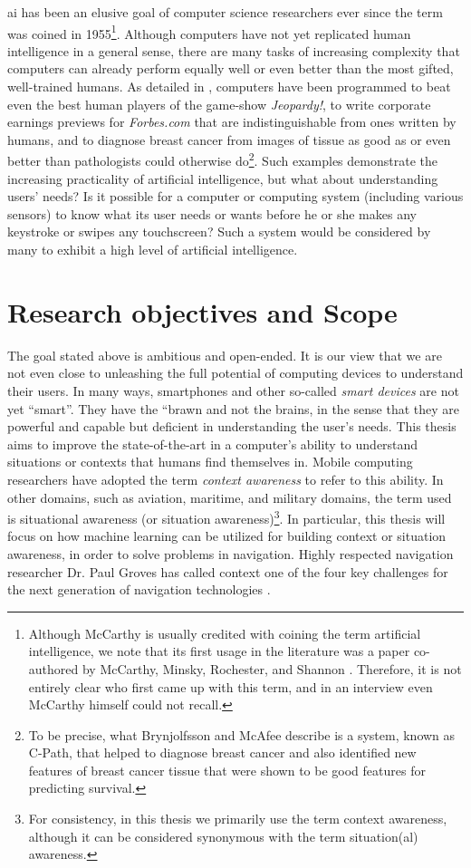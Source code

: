 \gls{ai} has been an elusive goal of computer science researchers ever since the term was coined in 1955\footnote{Although McCarthy is usually credited with coining the term artificial intelligence, we note that its first usage in the literature was a paper co-authored by McCarthy, Minsky, Rochester, and Shannon \cite{McCarthy1955}. Therefore, it is not entirely clear who first came up with this term, and in an interview even McCarthy himself could not recall.%
}. Although computers have not yet replicated human intelligence in a general sense, there are many tasks of increasing complexity that computers can already perform equally well or even better than the most gifted, well-trained humans. As detailed in \cite{brynjolfsson_2014}, computers have been programmed to beat even the best human players of the game-show \emph{Jeopardy!}, to write corporate earnings previews for \emph{Forbes.com} that are indistinguishable from ones written by humans, and to diagnose breast cancer from images of tissue as good as or even better than pathologists could otherwise do\footnote{To be precise, what Brynjolfsson and McAfee describe is a system, known as C-Path, that helped to diagnose breast cancer and also identified new features of breast cancer tissue that were shown to be good features for predicting survival.}. Such examples demonstrate the increasing practicality of artificial intelligence, but what about understanding users' needs? Is it possible for a computer or computing system (including various sensors) to know what its user needs or wants before he or she makes any keystroke or swipes any touchscreen? Such a system would be considered by many to exhibit a high level of artificial intelligence.

\section{Research objectives and Scope}
\label{sec:objectives}

The goal stated above is ambitious and open-ended. It is our view that we are not even close to unleashing the full potential of computing devices to understand their users. In many ways, smartphones and other so-called \emph{smart devices} are not yet ``smart''. They have the ``brawn and not the brains, in the sense that they are powerful and capable but deficient in understanding the user's needs. This thesis aims to improve the state-of-the-art in a computer's ability to understand situations or contexts that humans find themselves in. Mobile computing researchers have adopted the term \emph{context awareness} to refer to this ability. In other domains, such as aviation, maritime, and military domains, the term used is situational awareness (or situation awareness)\footnote{For consistency, in this thesis we primarily use the term context awareness, although it can be considered synonymous with the term situation(al) awareness.}. In particular, this thesis will focus on how machine learning can be utilized for building context or situation awareness, in order to solve problems in navigation. Highly respected navigation researcher Dr. Paul Groves has called context one of the four key challenges for the next generation of navigation technologies \cite{Groves2014}.


